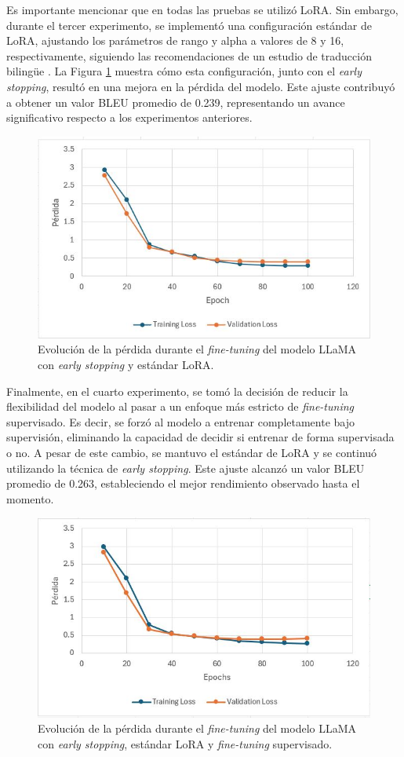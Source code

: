 Es importante mencionar que en todas las pruebas se utilizó LoRA. Sin embargo, durante el tercer experimento, se implementó una configuración estándar de LoRA, ajustando los parámetros de rango y alpha a valores de 8 y 16, respectivamente, siguiendo las recomendaciones de un estudio de traducción bilingüe \cite{weller2022pretrained}. La Figura \ref{fig:LLAMAm3} muestra cómo esta configuración, junto con el \textit{early stopping}, resultó en una mejora en la pérdida del modelo. Este ajuste contribuyó a obtener un valor BLEU promedio de 0.239, representando un avance significativo respecto a los experimentos anteriores.

\vspace{0.5cm}
\begin{figure}[H]
\centering
	\includegraphics[height=5.5 cm]{figuras/Resultado3.JPG}
    \caption{Evolución de la pérdida durante el \textit{fine-tuning} del modelo LLaMA con \textit{early stopping} y estándar LoRA.}
    \label{fig:LLAMAm3}
\end{figure}

Finalmente, en el cuarto experimento, se tomó la decisión de reducir la flexibilidad del modelo al pasar a un enfoque más estricto de \textit{fine-tuning} supervisado. Es decir, se forzó al modelo a entrenar completamente bajo supervisión, eliminando la capacidad de decidir si entrenar de forma supervisada o no. A pesar de este cambio, se mantuvo el estándar de LoRA y se continuó utilizando la técnica de \textit{early stopping}. Este ajuste alcanzó un valor BLEU promedio de 0.263, estableciendo el mejor rendimiento observado hasta el momento.

\vspace{0.5cm}
\begin{figure}[H]
\centering
	\includegraphics[height=5.5 cm]{figuras/Resultado4.JPG}
    \caption{Evolución de la pérdida durante el \textit{fine-tuning} del modelo LLaMA con \textit{early stopping}, estándar LoRA y \textit{fine-tuning} supervisado.}
    \label{fig:LLAMAm4}
\end{figure}


